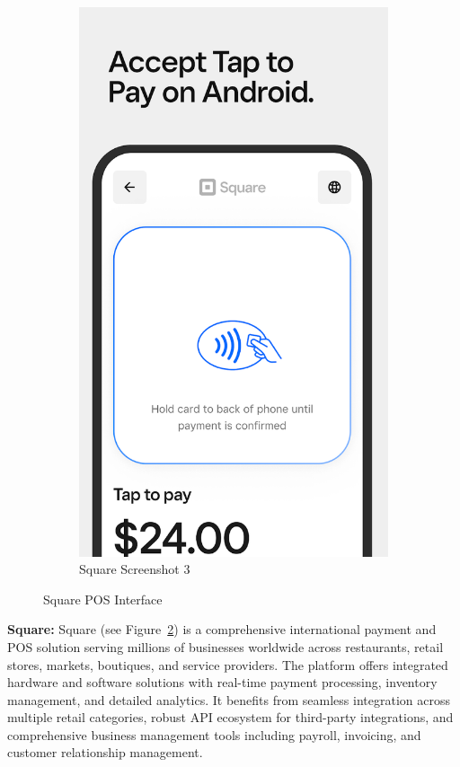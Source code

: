 \begin{figure}[!htb]
\begin{subfigure}[b]{0.32\textwidth}
        \includegraphics[width=\textwidth]{images/square_screenshot_3.png}
        \caption{Square Screenshot 3}
        \label{fig:square_3}
    \end{subfigure}
    \caption{Square POS Interface}
    \label{fig:square_interface}
\end{figure}

\textbf{Square:} Square (see Figure~\ref{fig:square_interface}) is a comprehensive international payment and POS solution serving millions of businesses worldwide across restaurants, retail stores, markets, boutiques, and service providers. The platform offers integrated hardware and software solutions with real-time payment processing, inventory management, and detailed analytics. It benefits from seamless integration across multiple retail categories, robust API ecosystem for third-party integrations, and comprehensive business management tools including payroll, invoicing, and customer relationship management.

